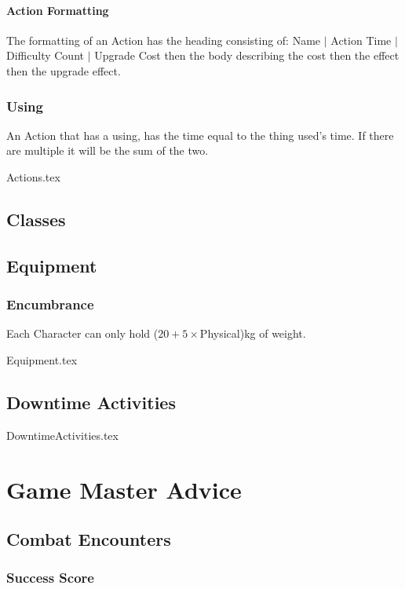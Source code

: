 \documentclass[a4paper,12pt,oneside]{book}
\begin{document}
            \subsubsection{Action Formatting}
                The formatting of an Action has the heading consisting of: Name $\vert$ Action Time $\vert$ Difficulty Count $\vert$ Upgrade Cost then the body describing the cost then the effect then the upgrade effect.

            \subsection{Using}
                An Action that has a using, has the time equal to the thing used's time. If there are multiple it will be the sum of the two.

            {Actions.tex}
                
        \section{Classes}
        \section{Equipment}
            \subsection{Encumbrance}
                Each Character can only hold ($20 + 5\times$Physical)kg of weight.

            {Equipment.tex}
        \section{Downtime Activities}
            {DowntimeActivities.tex}

    \chapter{Game Master Advice}
        \section{Combat Encounters}
            \subsection{Success Score}
\end{document}
